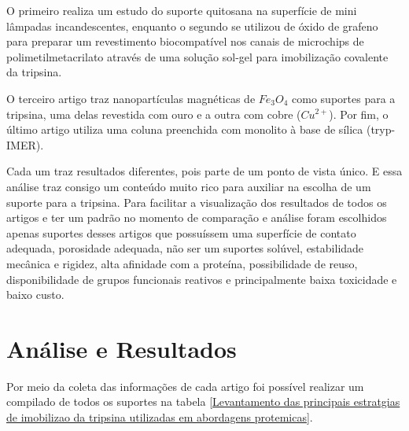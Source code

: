 \documentclass[
	12pt,				%
	openright,			%
	oneside,			%
	a4paper,			%
	english,			%
	french,				%
	spanish,			%
	brazil				%
	]{abntex2}
\begin{document}
O primeiro realiza um estudo do suporte quitosana na superfície de mini lâmpadas incandescentes, enquanto o segundo se utilizou de óxido de grafeno para preparar um revestimento biocompatível nos canais de microchips de polimetilmetacrilato através de uma solução sol-gel para imobilização covalente da tripsina.

O terceiro artigo traz nanopartículas magnéticas de $Fe_{3}O_{4}$ como suportes para a tripsina, uma delas revestida com ouro e a outra com cobre ($Cu^{2+}$). Por fim, o último artigo utiliza uma coluna preenchida com monolito à base de sílica (tryp-IMER).

Cada um traz resultados diferentes, pois parte de um ponto de vista único. E essa análise traz consigo um conteúdo muito rico para auxiliar na escolha de um suporte para a tripsina. Para facilitar a visualização dos resultados de todos os artigos e ter um padrão no momento de comparação e análise foram escolhidos apenas suportes desses artigos que possuíssem uma superfície de contato adequada, porosidade adequada, não ser um suportes solúvel, estabilidade mecânica e rigidez, alta afinidade com a proteína, possibilidade de reuso, disponibilidade de grupos funcionais reativos e principalmente baixa toxicidade e baixo custo. 

\newpage
\section{Análise e Resultados}
\pagestyle{fancy}

Por meio da coleta das informações de cada artigo foi possível realizar um compilado de todos os suportes na tabela \ref{Levantamento das principais estratgias de imobilizao da tripsina utilizadas em abordagens protemicas}. \cite{furlani2020imobilizaccao}
\end{document}
